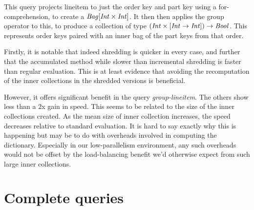 This query projects lineitem to just the order key and part key using a for-comprehension, to create a $\textrm{\textit{Bag}}[\textrm{\textit{Int}} \times \textrm{\textit{Int}}]$. It then then applies the group operator to this, to produce a collection of type $(\textrm{\textit{Int}} \times [\textrm{\textit{Int}} \rightarrow \textrm{\textit{Int}}]) \rightarrow \textrm{\textit{Bool}}$. This represents order keys paired with an inner bag of the part keys from that order.

Firstly, it is notable that indeed shredding is quicker in every case, and further that the accumulated method while slower than incremental shredding is faster than regular evaluation. This is at least evidence that avoiding the recomputation of the inner collections in the shredded versions is beneficial.

However, it offers significant benefit in the query \textit{group-lineitem}. The others show less than a 2x gain in speed. This seems to be related to the size of the inner collections created. As the mean size of inner collection increases, the speed decreases relative to standard evaluation. It is hard to say exactly why this is happening but may be to do with overheads involved in computing the dictionary. Especially in our low-parallelism environment, any such overheads would not be offset by the load-balancing benefit we'd otherwise expect from such large inner collections.

\section{Complete queries}

